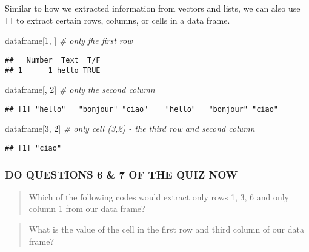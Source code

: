 \documentclass[
]{book}
\newenvironment{Shaded}{\begin{snugshade}}{\end{snugshade}}
\newcommand{\CommentTok}[1]{\textcolor[rgb]{0.56,0.35,0.01}{\textit{#1}}}
\newcommand{\DecValTok}[1]{\textcolor[rgb]{0.00,0.00,0.81}{#1}}
\newcommand{\NormalTok}[1]{#1}
\begin{document}
Similar to how we extracted information from vectors and lists, we can also use \texttt{{[}{]}} to extract certain rows, columns, or cells in a data frame.

\begin{Shaded}
\begin{Highlighting}[]
\NormalTok{dataframe[}\DecValTok{1}\NormalTok{, ] }\CommentTok{\# only fhe first row}
\end{Highlighting}
\end{Shaded}

\begin{verbatim}
##   Number  Text  T/F
## 1      1 hello TRUE
\end{verbatim}

\begin{Shaded}
\begin{Highlighting}[]
\NormalTok{dataframe[, }\DecValTok{2}\NormalTok{] }\CommentTok{\# only the second column}
\end{Highlighting}
\end{Shaded}

\begin{verbatim}
## [1] "hello"   "bonjour" "ciao"    "hello"   "bonjour" "ciao"
\end{verbatim}

\begin{Shaded}
\begin{Highlighting}[]
\NormalTok{dataframe[}\DecValTok{3}\NormalTok{, }\DecValTok{2}\NormalTok{] }\CommentTok{\# only cell (3,2) {-} the third row and second column}
\end{Highlighting}
\end{Shaded}

\begin{verbatim}
## [1] "ciao"
\end{verbatim}

\hypertarget{do-questions-6-7-of-the-quiz-now}{%
\subsubsection{DO QUESTIONS 6 \& 7 OF THE QUIZ NOW}\label{do-questions-6-7-of-the-quiz-now}}

\begin{quote}
Which of the following codes would extract only rows 1, 3, 6 and only column 1 from our data frame?
\end{quote}

\begin{quote}
What is the value of the cell in the first row and third column of our data frame?
\end{quote}
\end{document}

